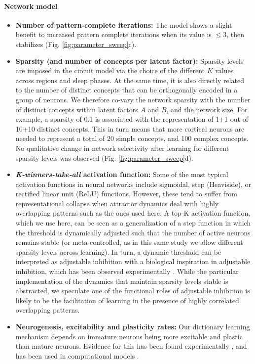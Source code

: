 \documentclass{article}
\begin{document}
\paragraph*{Network model}
\begin{itemize}
    \item \textbf{Number of pattern-complete iterations: } 
    The model shows a slight benefit to increased pattern complete iterations when its value is $\leq 3$, then stabilizes (Fig. \ref{fig:parameter_sweep}c).
    \item \textbf{Sparsity (and number of concepts per latent factor): } Sparsity levels are imposed in the circuit model via the choice of the different $K$ values across regions and sleep phases. At the same time, it is also directly related to the number of distinct concepts that can be orthogonally encoded in a group of neurons. We therefore co-vary the network sparsity with the number of distinct concepts within latent factors $A$ and $B$, and the network size. For example, a sparsity of 0.1 is associated with the representation of 1+1 out of 10+10 distinct concepts. This in turn means that more cortical neurons are needed to represent a total of 20 simple concepts, and 100 complex concepts. No qualitative change in network selectivity after learning for different sparsity levels was observed (Fig. \ref{fig:parameter_sweep}d).
    \item \textbf{\textit{K-winners-take-all} activation function: }Some of the most typical activation functions in neural networks include sigmoidal, step (Heaviside), or rectified linear unit (ReLU) functions. However, these tend to suffer from representational collapse when attractor dynamics deal with highly overlapping patterns such as the ones used here. A top-K activation function, which we use here, can be seen as a generalization of a step function in which the threshold is dynamically adjusted such that the number of active neurons remains stable (or meta-controlled, as in this same study we allow different sparsity levels across learning). In turn, a dynamic threshold can be interpreted as adjustable inhibition  with a biological inspiration in adjustable inhibition, which has been observed experimentally . While the particular implementation of the dynamics that maintain sparsity levels stable is abstracted, we speculate one of the functional roles of adjustable inhibition is likely to be the facilitation of learning in the presence of highly correlated overlapping patterns.
    \item \textbf{Neurogenesis, excitability and plasticity rates: }Our dictionary learning mechanism depends on immature neurons being more excitable and plastic than mature neurons. Evidence for this has been found experimentally , and has been used in computational models .

\end{itemize}
\end{document}
